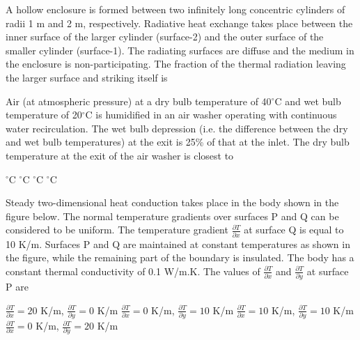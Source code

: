 \documentclass[addpoints,11pt]{exam}
\begin{document}
\begin{questions}
        \question A hollow enclosure is formed between two infinitely long concentric cylinders of radii 1 m and 2 m, respectively. Radiative heat exchange takes place between the inner surface of the larger cylinder (surface-2) and the outer surface of the smaller cylinder (surface-1). The radiating surfaces are diffuse and the medium in the enclosure is non-participating. The fraction of the thermal radiation leaving the larger surface and striking itself is%

        \begin{oneparchoices}
        \end{oneparchoices}

        \question Air (at atmospheric pressure) at a dry bulb temperature of 40$^\circ$C and wet bulb temperature of 20$^\circ$C is humidified in an air washer operating with continuous water recirculation. The wet bulb depression (i.e. the difference between the dry and wet bulb temperatures) at the exit is 25\% of that at the inlet. The dry bulb temperature at the exit of the air washer is closest to

        \begin{oneparchoices}
            $^\circ$C
            $^\circ$C
            $^\circ$C
            $^\circ$C
        \end{oneparchoices}

        \question Steady two-dimensional heat conduction takes place in the body shown in the figure below. The normal temperature gradients over surfaces P and Q can be considered to be uniform. The temperature gradient $\frac{\partial{T}}{\partial{x}}$ at surface Q is equal to 10 K/m. Surfaces P and Q are maintained at constant temperatures as shown in the figure, while the remaining part of the boundary is insulated. The body has a constant thermal conductivity of 0.1 W/m.K. The values of $\frac{\partial{T}}{\partial{x}}$ and $\frac{\partial{T}}{\partial{y}}$ at surface P are%

        \begin{oneparchoices}
            \choice $\frac{\partial{T}}{\partial{x}} = 20$ K/m, $\frac{\partial{T}}{\partial{y}} = 0$ K/m
            \choice $\frac{\partial{T}}{\partial{x}} = 0$ K/m, $\frac{\partial{T}}{\partial{y}} = 10$ K/m
            \choice $\frac{\partial{T}}{\partial{x}} = 10$ K/m, $\frac{\partial{T}}{\partial{y}} = 10$ K/m
            \choice $\frac{\partial{T}}{\partial{x}} = 0$ K/m, $\frac{\partial{T}}{\partial{y}} = 20$ K/m
        \end{oneparchoices}


\end{questions}
\end{document}
